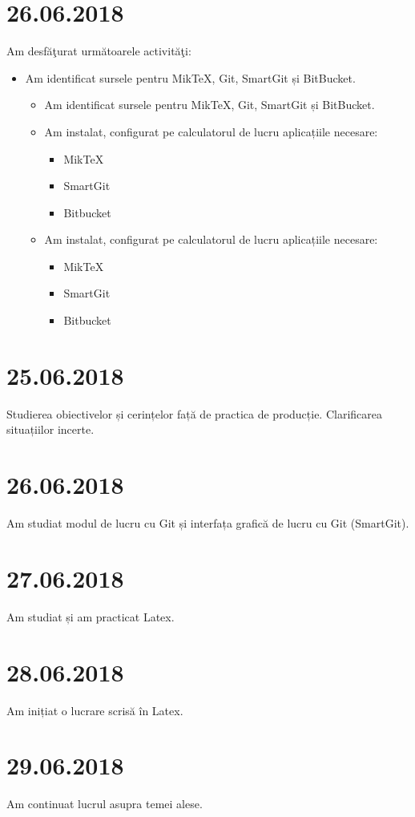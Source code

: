 \documentclass{report}
\begin{document}
\chapter{26.06.2018}
Am desfăţurat următoarele activităţi:
\begin{itemize}
\item
Am identificat sursele pentru MikTeX, Git, SmartGit și BitBucket.
\begin{itemize}
\item
Am identificat sursele pentru MikTeX, Git, SmartGit și BitBucket.
\item
Am instalat, configurat pe calculatorul de lucru aplicațiile necesare:
\begin{itemize}
\item
MikTeX
\item
SmartGit
\item
Bitbucket
\end{itemize}
\item
Am instalat, configurat pe calculatorul de lucru aplicațiile necesare:
\begin{itemize}
\item
MikTeX
\item
SmartGit
\item
Bitbucket
\end{itemize}

\end{itemize}
\end{itemize}

\chapter{25.06.2018}
Studierea obiectivelor și cerințelor față de practica de producție. Clarificarea situațiilor incerte.
\chapter{26.06.2018}
Am studiat modul de lucru cu Git și interfața grafică de lucru cu Git (SmartGit).
\chapter{27.06.2018}
Am studiat și am practicat Latex.
\chapter{28.06.2018}
Am inițiat o lucrare scrisă în Latex.
\chapter{29.06.2018}
Am continuat lucrul asupra temei alese.
\end{document}
